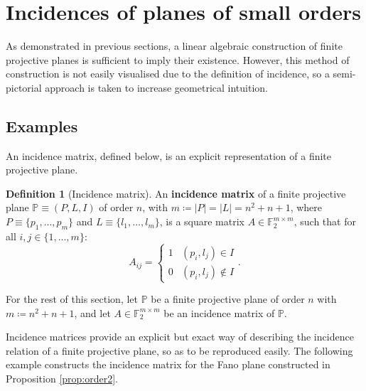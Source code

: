 \documentclass{report}
\newcommand{\F}{\mathbb{F}}
\renewcommand{\P}{\mathbb{P}}
\theoremstyle{definition}\newtheorem*{definition}{Definition}
\theoremstyle{definition}\newtheorem*{example}{Example}
\theoremstyle{remark}\newtheorem*{remark}{Remark}
\begin{document}
\section{Incidences of planes of small orders}

As demonstrated in previous sections, a linear algebraic construction of finite projective planes is sufficient to imply their existence. However, this method of construction is not easily visualised due to the definition of incidence, so a semi-pictorial approach is taken to increase geometrical intuition.

\subsection{Examples}

An incidence matrix, defined below, is an explicit representation of a finite projective plane.

\begin{definition}[Incidence matrix]
An \textbf{incidence matrix} of a finite projective plane $ \P \equiv (P, L, I) $ of order $ n $, with $ m \coloneqq |P| = |L| = n^2 + n + 1 $, where $ P \equiv \{ p_1, ..., p_m \} $ and $ L \equiv \{ l_1, ..., l_m \} $, is a square matrix $ A \in \F_2^{m \times m} $, such that for all $ i, j \in \{ 1, ..., m \} $: $$ A_{ij} = \begin{cases} 1 & (p_i, l_j) \in I \\ 0 & (p_i, l_j) \notin I \end{cases}. $$
\end{definition}

For the rest of this section, let $ \P $ be a finite projective plane of order $ n $ with $ m \coloneqq n^2 + n + 1 $, and let $ A \in \F_2^{m \times m} $ be an incidence matrix of $ \P $.

Incidence matrices provide an explicit but exact way of describing the incidence relation of a finite projective plane, so as to be reproduced easily. The following example constructs the incidence matrix for the Fano plane constructed in Proposition \ref{prop:order2}.
\end{document}
